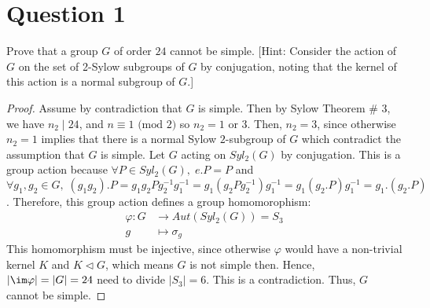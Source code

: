 \section{Question 1}

\begin{question}
    Prove that a group $G$ of order $24$ cannot be simple. [Hint: Consider the action of $G$ on the set of 2-Sylow subgroups of $G$ by conjugation, noting that the kernel of this action is a normal subgroup of $G$.]
\end{question}

\begin{answer}
    \begin{proof}
        Assume by contradiction that $G$ is simple. Then by Sylow Theorem \# 3, we have $n_2 \mid 24$, and $n \equiv 1 \text{ (mod 2)}$ so $n_2 = 1 \text{ or } 3$. Then, $n_2 = 3$, since otherwise $n_2 = 1$ implies that there is a normal Sylow $2$-subgroup of $G$ which contradict the assumption that $G$ is simple. Let $G$ acting on $Syl_2(G)$ by conjugation. This is a group action because $\forall P \in Syl_2(G),\;e.P = P$ and $\forall g_1,g_2 \in G,\;(g_1g_2).P = g_1g_2Pg_2^{-1}g_1^{-1} = g_1(g_2Pg_2^{-1})g_1^{-1} = g_1(g_2.P)g_1^{-1} = g_1.(g_2.P)$. Therefore, this group action defines a group homomorophism:
        \begin{equation}
            \begin{aligned}
                \varphi: G &\to Aut(Syl_2(G)) = S_3\\
                g &\mapsto \sigma_g
            \end{aligned}
        \end{equation}
        This homomorphism must be injective, since otherwise $\varphi$ would have a non-trivial kernel $K$ and $K \triangleleft G$, which means $G$ is not simple then. Hence, $\lvert \im \varphi \rvert = \lvert G \rvert = 24$ need to divide $\lvert S_3 \rvert = 6$. This is a contradiction. Thus, $G$ cannot be simple.
    \end{proof}
\end{answer}